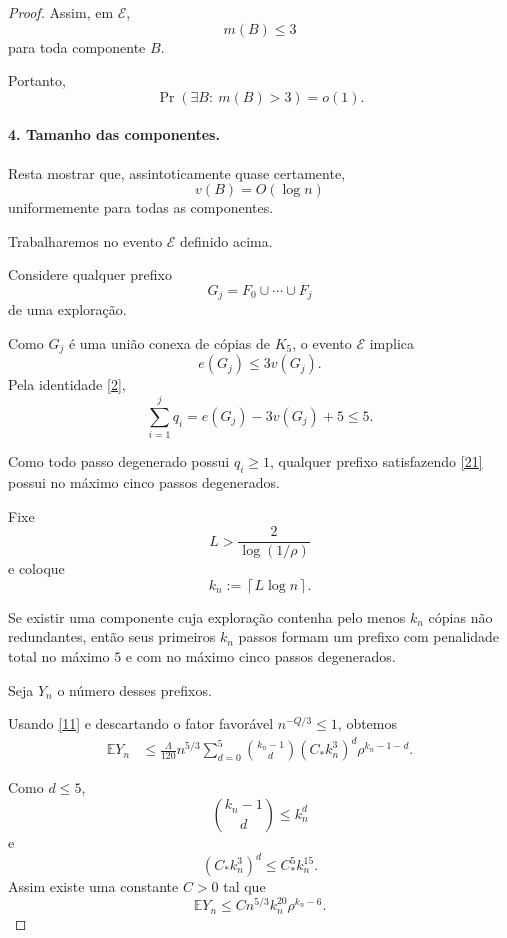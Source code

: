 \documentclass[reqno, 12pt]{amsart}
\numberwithin{equation}{section}
\theoremstyle{plain}
\theoremstyle{definition}
\begin{document}
\begin{proof}
  Assim, em $\mathcal E$,
  \[
    m(B)\le3
  \]
  para toda componente $B$.

  Portanto,
  \[
    \Pr\left(
    \exists B:\ m(B)>3
    \right)
    =
    o(1).
    \tag{20}\label{20}
  \]

  \paragraph{4. Tamanho das componentes.}

  Resta mostrar que, assintoticamente quase certamente,
  \[
    v(B)=O(\log n)
  \]
  uniformemente para todas as componentes.

  Trabalharemos no evento $\mathcal E$ definido acima.

  Considere qualquer prefixo
  \[
    G_j=F_0\cup\cdots\cup F_j
  \]
  de uma exploração.

  Como $G_j$ é uma união conexa de cópias de $K_5$, o evento
  $\mathcal E$ implica
  \[
    e(G_j)\le3v(G_j).
  \]
  Pela identidade \eqref{2},
  \[
    \sum_{i=1}^{j}q_i
    =
    e(G_j)-3v(G_j)+5
    \le5.
    \tag{21}\label{21}
  \]

  Como todo passo degenerado possui $q_i\ge1$, qualquer prefixo
  satisfazendo \eqref{21} possui no máximo cinco passos degenerados.

  Fixe
  \[
    L>
    \frac{2}{\log(1/\rho)}
    \tag{22}\label{22}
  \]
  e coloque
  \[
    k_n:=\left\lceil L\log n\right\rceil.
  \]

  Se existir uma componente cuja exploração contenha pelo menos
  $k_n$ cópias não redundantes, então seus primeiros $k_n$ passos
  formam um prefixo com penalidade total no máximo $5$ e com no máximo
  cinco passos degenerados.

  Seja $Y_n$ o número desses prefixos.

  Usando \eqref{11} e descartando o fator favorável
  $n^{-Q/3}\le1$, obtemos
  \[
    \begin{aligned}
      \mathbb E Y_n
       & \le
      \frac{\Lambda}{120}
      n^{5/3}
      \sum_{d=0}^{5}
      \binom{k_n-1}{d}
      (C_*k_n^3)^d
      \rho^{k_n-1-d}.
    \end{aligned}
    \tag{23}\label{23}
  \]

  Como $d\le5$,
  \[
    \binom{k_n-1}{d}
    \le
    k_n^d
  \]
  e
  \[
    (C_*k_n^3)^d
    \le
    C_*^5 k_n^{15}.
  \]
  Assim existe uma constante $C>0$ tal que
  \[
    \mathbb E Y_n
    \le
    C
    n^{5/3}
    k_n^{20}
    \rho^{k_n-6}.
    \tag{24}\label{24}
  \]


\end{proof}
\end{document}
